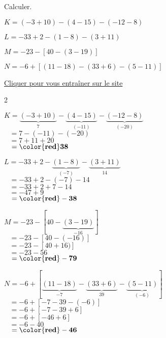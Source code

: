 \begin{exercice*}
    Calculer.
        \begin{list}{}
            \item $ K = (-3+10)-(4-15)-(-12-8)$
            \item $ L = -33+2-(1-8) -(3+11)$
            \item $ M = -23-[40-(3-19)]$
            \item $ N = -6+[(11-18)-(33+6)-(5-11)]$
        \end{list}

    \href{https://coopmaths.fr/mathalea.html?ex=5R22,s=20,s2=true,n=5,i=1&v=l}{Cliquer pour vous entraîner sur le site \mathaleaLogo} 
\end{exercice*}
\begin{corrige}
    \phantom{rrr}    
    \begin{multicols}2
        \begin{list}{}
            \item $ K=\underbrace{(-3+10)}_{7}-\underbrace{(4-15)}_{(-11)}-\underbrace{(-12-8)}_{(-20)}$\\
            $\phantom{A }=7-(-11)-(-20)$\\
            $\phantom{A }=7+11+20$\\
            $\phantom{A }=\mathbf{{\color{red}38}}$
            \item $ L=-33+2-\underbrace{(1-8)}_{(-7)} -\underbrace{(3+11)}_{14}$\\
            $\phantom{A }=-33+2-(-7)-14$\\
            $\phantom{A }=-33+2+7-14$\\
            $\phantom{A }=-47+9$\\
            $\phantom{A }=\mathbf{{\color{red}-38}}$
            \columnbreak
            \item $ M=-23-[40-\underbrace{(3-19)}_{-16}]$\\
            $\phantom{A }=-23-[40-(-16)]$\\
            $\phantom{A }=-23-[40+16)]$\\
            $\phantom{A }=-23-56$\\
            $\phantom{A }=\mathbf{{\color{red}-79}}$
            \item $ N=-6+[\underbrace{(11-18)}_{-7}-\underbrace{(33+6)}_{39}-\underbrace{(5-11)}_{(-6)}]$\\
            $\phantom{A }=-6+[-7-39-(-6)]$\\
            $\phantom{A }=-6+[-7-39+6]$\\
            $\phantom{A }=-6+[-46+6]$\\
            $\phantom{A }=-6-40$\\
            $\phantom{A }=\mathbf{{\color{red}-46}}$
        \end{list}
    \end{multicols}
\end{corrige}